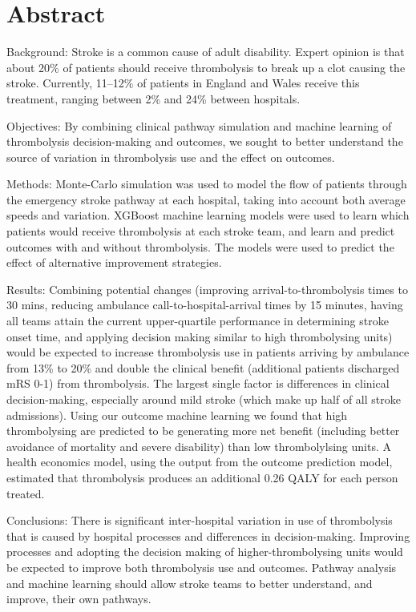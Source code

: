 \section*{Abstract}

Background: Stroke is a common cause of adult disability. Expert opinion is that about 20\% of patients should receive thrombolysis to break up a clot causing the stroke. Currently, 11–12\% of patients in England and Wales receive this treatment, ranging between 2\% and 24\% between hospitals.

Objectives: By combining clinical pathway simulation and machine learning of thrombolysis decision-making and outcomes, we sought to better understand the source of variation in thrombolysis use and the effect on outcomes.

Methods: Monte-Carlo simulation was used to model the flow of patients through the emergency stroke pathway at each hospital, taking into account both average speeds and variation. XGBoost machine learning models were used to learn which patients would receive thrombolysis at each stroke team, and learn and predict outcomes with and without thrombolysis. The models were used to predict the effect of alternative improvement strategies.

Results: Combining potential changes (improving arrival-to-thrombolysis times to 30 mins, reducing ambulance call-to-hospital-arrival times by 15 minutes, having all teams attain the current upper-quartile performance in determining stroke onset time, and applying decision making similar to high thrombolysing units) would be expected to increase thrombolysis use in patients arriving by ambulance from 13\% to 20\% and double the clinical benefit (additional patients discharged mRS 0-1) from thrombolysis. The largest single factor is differences in clinical decision-making, especially around mild stroke (which make up half of all stroke admissions). Using our outcome machine learning we found that high thrombolysing are predicted to be generating more net benefit (including better avoidance of mortality and severe disability) than low thrombolylsing units. A health economics model, using the output from the outcome prediction model, estimated that thrombolysis produces an additional 0.26 QALY for each person treated.

Conclusions: There is significant inter-hospital variation in use of thrombolysis that is caused by hospital processes and differences in decision-making. Improving processes and adopting the decision making of higher-thrombolysing units would be expected to improve both thrombolysis use and outcomes. Pathway analysis and machine learning should allow stroke teams to better understand, and improve, their own pathways.